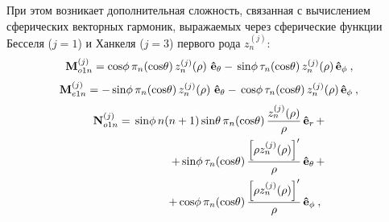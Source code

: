 При этом возникает дополнительная сложность, связанная с вычислением
сферических векторных гармоник, выражаемых через сферические функции
Бесселя ($j=1$) и Ханкеля ($j=3$) первого рода $z_n^{(j)}$:
\begin{equation}
  \label{eq:2p1}
 \begin{alignedat}{2}
  {\rm\mathbf{M}}_{o1n}^{(j)} ={\rm cos} \phi\,
         \pi_n\!\left({\rm  cos} \theta\right)
         z_n^{(j)}\!\left( \rho \right)\,
         {\boldsymbol{\hat{\rm e}}}_{\theta}   
-\,{\rm sin} \phi\,
         \tau_n\!\left({\rm  cos} \theta\right)
         z_n^{(j)}\!\left( \rho \right)\,
         &{\boldsymbol{\hat{\rm e}}}_{\phi}\:,
 \end{alignedat}
\end{equation}
%
\begin{equation}
 \begin{alignedat}{2}
  {\rm\mathbf{M}}_{e1n}^{(j)} =-\,{\rm sin} \phi\,
         \pi_n\!\left({\rm  cos} \theta\right)
         z_n^{(j)}\!\left( \rho \right)\,
         {\boldsymbol{\hat{\rm e}}}_{\theta}   
-\, {\rm cos} \phi\,
         \tau_n\!\left({\rm  cos} \theta\right)
         z_n^{(j)}\!\left( \rho \right)\,
         &{\boldsymbol{\hat{\rm e}}}_{\phi}\:,
 \end{alignedat}
\end{equation}
%
\begin{equation}
 \begin{alignedat}{2}
{\mathbf{N}}_{o1n}^{(j)} = \,{\sin} \phi\,n\!\left(n+1\right)
         {\sin}\theta\,
         \pi_n\!\left({\cos} \theta\right)
         \frac{
               z_n^{(j)}\!\left( \rho \right)
              }{\rho}\,
           &{\boldsymbol{\hat{\mathrm e}}}_{r}\,+   \\
+\,
{\sin} \phi\,
         \tau_n\!\left({\cos} \theta\right)
         \frac{
            \left[\rho z_n^{(j)}\!\left( \rho \right)\right]^{\prime}
              }{\rho}\,
            &{\boldsymbol{\hat{\mathrm e}}}_{\theta}\,+   \\
+\,
{\cos} \phi\,
         \pi_n\!\left({\cos} \theta\right)
         \frac{
            \left[\rho z_n^{(j)}\!\left( \rho \right)\right]^{\prime}
              }{\rho}\,
            &{\boldsymbol{\hat{\rm e}}}_{\phi}\:,
\end{alignedat}
\end{equation}
%
